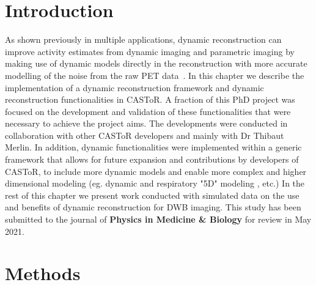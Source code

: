 \section{Introduction}

As shown previously in multiple applications, dynamic reconstruction can improve activity estimates from dynamic imaging and parametric imaging by making use of dynamic models directly in the reconstruction with more accurate modelling of the noise from the raw PET data~\cite{Reader2014}. 
In this chapter we describe the implementation of a dynamic reconstruction framework and dynamic reconstruction functionalities in CASToR. A fraction of this PhD project was focused on the development and validation of these functionalities that were necessary to achieve the project aims. The developments were conducted in collaboration with other CASToR developers and mainly with Dr Thibaut Merlin.
In addition, dynamic functionalities were implemented within a generic framework that allows for future expansion and contributions by developers of CASToR, to include more dynamic models and enable more complex and higher dimensional modeling (eg. dynamic and respiratory "5D" modeling , etc.)
In the rest of this chapter we present work conducted with simulated data on the use and benefits of dynamic reconstruction for DWB imaging. This study has been submitted to the journal of \textbf{Physics in Medicine \& Biology} for review in May 2021. 

\section{Methods}

